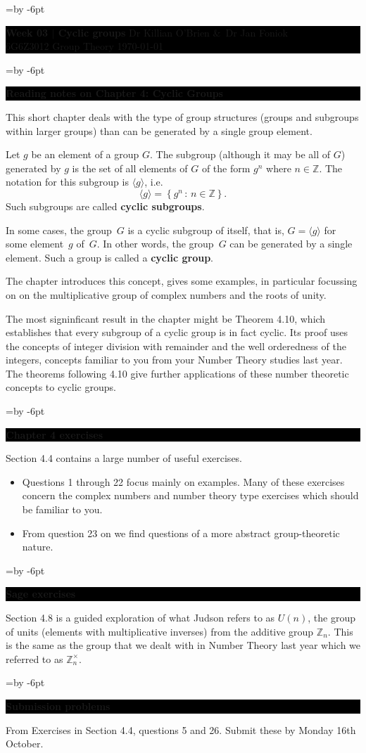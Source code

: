 \documentclass[oneside,10pt]{amsart}
\def\setcboxwidth{\cboxwidth=\linewidth\advance\cboxwidth by -6pt\relax}
\newcommand{\cbox}[1]{\setcboxwidth\colorbox{black}{\begin{minipage}{\cboxwidth}\color{white}\sffamily #1 \end{minipage}}}
\newcommand{\tuttitle}[4]{\cbox{\textbf{#1} \hfill {#2}\\{#3} \hfill {\Small #4}}\vskip 20pt}
\newcommand{\topic}[1]{\bigbreak\cbox{\textbf{#1}}\medskip}
\begin{document}
\tuttitle{Week 03 $|$ Cyclic groups}{Dr Killian O'Brien \&\ Dr Jan Foniok}{6G6Z3012 Group Theory}{\today}

\topic{Reading notes on Chapter 4: Cyclic Groups}
This short chapter deals with the type of group structures (groups and subgroups within larger groups) than can be generated by a single group element.

Let $g$ be an element of a group $G$. The subgroup (although it may be all of $G$) generated by $g$ is the set of all elements of $G$ of the form $g^n$ where $n \in \mathbb{Z}$. The notation for this subgroup is $\langle g \rangle$, i.e.
$$\langle g \rangle = \left \{ g^n \, : \, n \in \mathbb{Z} \right \}.$$ Such subgroups are called
\textbf{cyclic subgroups}.

In some cases, the group~$G$ is a cyclic subgroup of itself, that is,
$G=\langle g \rangle$ for some element~$g$ of~$G$.
In other words, the group~$G$ can be generated by a single element.
Such a group is called a \textbf{cyclic group}.

The chapter introduces this concept, gives some examples, in particular focussing on on the multiplicative group of complex numbers and the roots of unity.

The most signinficant result in the chapter might be Theorem 4.10,
which establishes that every subgroup of a cyclic group is in fact cyclic.
Its proof uses the concepts of integer division with remainder and the well orderedness of the integers,
concepts familiar to you from your Number Theory studies last year.
The theorems following 4.10 give further applications of these number theoretic concepts to cyclic groups.

\vskip 4pt

\topic{Chapter 4 exercises}
Section 4.4 contains a large number of useful exercises.

\begin{itemize}
\item
Questions 1 through 22 focus mainly on examples. Many of these exercises concern the complex numbers and number theory type exercises which should be familiar to you.
\item
From question 23 on we find questions of a more abstract group-theoretic nature.
\end{itemize}

\vskip 4pt

\topic{Sage exercises}
Section 4.8 is a guided exploration of what Judson refers to as $U(n)$, the group of units (elements with multiplicative inverses) from the additive group $\mathbb{Z}_n$. This is the same as the group that we dealt with in Number Theory last year which we referred to as $\mathbb{Z}_n^\times$.

\topic{Submission problems}

From Exercises in Section 4.4, questions 5 and 26. Submit these by Monday 16th October.
\end{document}
